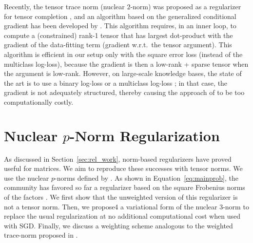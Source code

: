 \documentclass{article}
\begin{document}
Recently, the tensor trace norm (nuclear $2$-norm) was proposed as a regularizer for tensor completion \citet{yuan_tensor_2016}, and an algorithm based on the generalized conditional gradient has been developed by \citet{cheng_scalable_2016}. This algorithm requires, in an inner loop, to compute a (constrained) rank-1 tensor that has largest dot-product with the gradient of the data-fitting term (gradient w.r.t.\ the tensor argument). This algorithm is efficient in our setup only with the square error loss (instead of the multiclass log-loss), because the gradient is then a low-rank + sparse tensor when the argument is low-rank. However, on large-scale knowledge bases, the state of the art is to use a binary log-loss or a multiclass log-loss
\citep{trouillon_complex_2016,kadlec_knowledge_2017}; in that case, the gradient is not adequately structured, thereby causing the approach of \cite{cheng_scalable_2016} to be too computationally costly.

\section{Nuclear $p$-Norm Regularization}
As discussed in Section~\ref{sec:rel_work}, norm-based regularizers have proved useful for matrices. We aim to reproduce these successes with tensor norms. We use the nuclear $p$-norms defined by \citet{friedland_nuclear_2014}. As shown in Equation~\eqref{eq:mainprob}, the community has favored so far a regularizer based on the square Frobenius norms of the factors \citep{yang_embedding_2014, trouillon_complex_2016}. We  first show that the unweighted version of this regularizer is not a tensor norm. Then, we propose4 a variational form of the nuclear $3$-norm to replace the usual regularization at no additional computational cost when used with SGD. Finally, we discuss a weighting scheme analogous to the weighted trace-norm proposed in \citet{srebro_collaborative_2010}.
\end{document}
